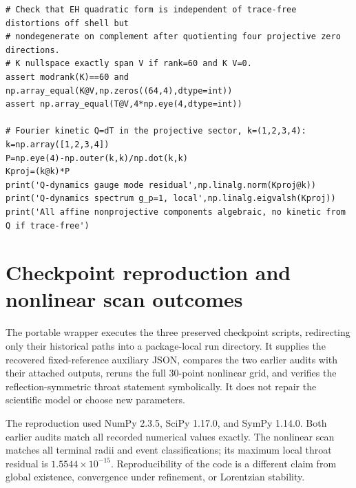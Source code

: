 \documentclass[11pt,oneside]{report}
\begin{document}
\begin{Verbatim}[breaklines=true,breakanywhere=true,fontsize=\scriptsize]
# Check that EH quadratic form is independent of trace-free distortions off shell but
# nondegenerate on complement after quotienting four projective zero directions.
# K nullspace exactly span V if rank=60 and K V=0.
assert modrank(K)==60 and np.array_equal(K@V,np.zeros((64,4),dtype=int))
assert np.array_equal(T@V,4*np.eye(4,dtype=int))

# Fourier kinetic Q=dT in the projective sector, k=(1,2,3,4):
k=np.array([1,2,3,4])
P=np.eye(4)-np.outer(k,k)/np.dot(k,k)
Kproj=(k@k)*P
print('Q-dynamics gauge mode residual',np.linalg.norm(Kproj@k))
print('Q-dynamics spectrum g_p=1, local',np.linalg.eigvalsh(Kproj))
print('All affine nonprojective components algebraic, no kinetic from Q if trace-free')

\end{Verbatim}
\chapter{Checkpoint reproduction and nonlinear scan outcomes}
\label{app:checkpoint-results}
The portable wrapper  executes the three preserved checkpoint scripts, redirecting only their historical  paths into a package-local run directory. It supplies the recovered fixed-reference auxiliary JSON, compares the two earlier audits with their attached outputs, reruns the full 30-point nonlinear grid, and verifies the reflection-symmetric throat statement symbolically. It does not repair the scientific model or choose new parameters.

The reproduction used NumPy 2.3.5, SciPy 1.17.0, and SymPy 1.14.0. Both earlier audits match all recorded numerical values exactly. The nonlinear scan matches all terminal radii and event classifications; its maximum local throat residual is $1.5544\times10^{-15}$. Reproducibility of the code is a different claim from global existence, convergence under refinement, or Lorentzian stability.
\end{document}
